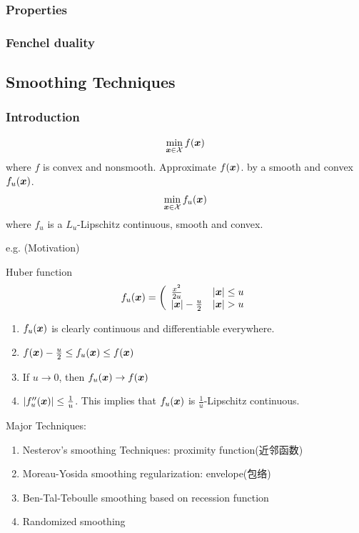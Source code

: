 \subsubsection{Properties}

\subsubsection{Fenchel duality}

\subsection{Smoothing Techniques}
\subsubsection{Introduction}
\begin{align*}
    \min_{\bm{x}\in\mathcal{X}}f(\bm{x})
\end{align*}
where $f$ is convex and nonsmooth. Approximate $f(\bm{x})$. by a smooth and convex $f_u(\bm{x})$. 
\begin{align*}
    \min_{\bm{x}\in\mathcal{X}}f_u(\bm{x})
\end{align*}
where $f_u$ is a $L_u$-Lipschitz continuous, smooth and convex. 

e.g. (Motivation) 

Huber function
\begin{align*}
    f_u(\bx)=\left( \begin{array}{ll}
        \frac{x^2}{2u} & |\bx|\le u\\
        |\bx|-\frac{u}{2} & |\bx|>u
    \end{array} \right.
\end{align*}
\begin{enumerate}
    \item $f_u(\bm{x})$ is clearly continuous and differentiable everywhere. 
    \item $f(\bm{x})-\frac{u}{2}\le f_u(\bm{x})\le f(\bm{x})$
    \item If $u\to 0$, then $f_u(\bm{x})\to f(\bm{x})$
    \item $|f''_u(\bm{x})|\le\frac{1}{u}$. This implies that $f_u(\bm{x})$ is $\frac{1}{u}$-Lipschitz continuous. 
\end{enumerate}

Major Techniques:
\begin{enumerate}
    \item Nesterov's smoothing Techniques: proximity function(近邻函数)
    \item Moreau-Yosida smoothing regularization: envelope(包络)
    \item Ben-Tal-Teboulle smoothing based on recession function
    \item Randomized smoothing
\end{enumerate}

